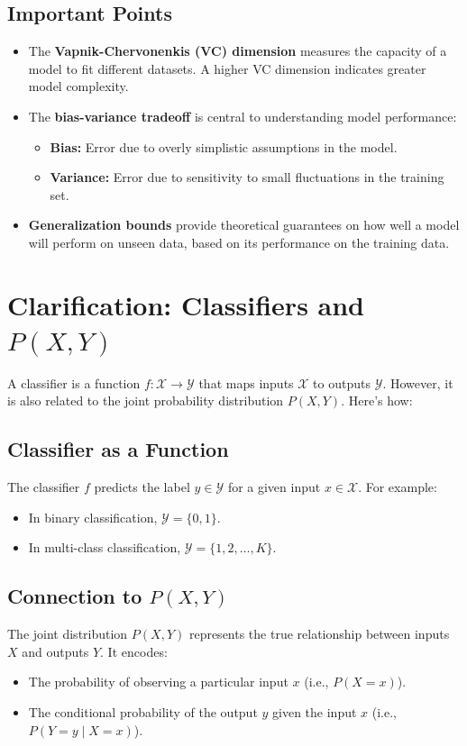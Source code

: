 \begin{notechapter}
\subsection{Important Points}
\begin{itemize}
    \item The \textbf{Vapnik-Chervonenkis (VC) dimension} measures the capacity of a model to fit different datasets. A higher VC dimension indicates greater model complexity.
    \item The \textbf{bias-variance tradeoff} is central to understanding model performance:
    \begin{itemize}
        \item \textbf{Bias:} Error due to overly simplistic assumptions in the model.
        \item \textbf{Variance:} Error due to sensitivity to small fluctuations in the training set.
    \end{itemize}
    \item \textbf{Generalization bounds} provide theoretical guarantees on how well a model will perform on unseen data, based on its performance on the training data.
\end{itemize}

\section{Clarification: Classifiers and \( P(X, Y) \)}

A classifier is a function \( f: \mathcal{X} \rightarrow \mathcal{Y} \) that maps inputs \( \mathcal{X} \) to outputs \( \mathcal{Y} \). However, it is also related to the joint probability distribution \( P(X, Y) \). Here's how:

\subsection{Classifier as a Function}
The classifier \( f \) predicts the label \( y \in \mathcal{Y} \) for a given input \( x \in \mathcal{X} \). For example:
\begin{itemize}
    \item In binary classification, \( \mathcal{Y} = \{0, 1\} \).
    \item In multi-class classification, \( \mathcal{Y} = \{1, 2, \dots, K\} \).
\end{itemize}

\subsection{Connection to \( P(X, Y) \)}
The joint distribution \( P(X, Y) \) represents the true relationship between inputs \( X \) and outputs \( Y \). It encodes:
\begin{itemize}
    \item The probability of observing a particular input \( x \) (i.e., \( P(X = x) \)).
    \item The conditional probability of the output \( y \) given the input \( x \) (i.e., \( P(Y = y \mid X = x) \)).
\end{itemize}


\end{notechapter}
